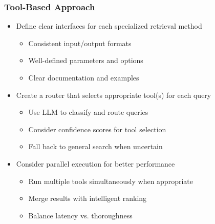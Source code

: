 {    \begin{frame}
        \frametitle{Tool-Based Approach}
        \begin{itemize}
            \item Define clear interfaces for each specialized retrieval method
            \begin{itemize}
                \item Consistent input/output formats
                \item Well-defined parameters and options
                \item Clear documentation and examples
            \end{itemize}
            \item Create a router that selects appropriate tool(s) for each query
            \begin{itemize}
                \item Use LLM to classify and route queries
                \item Consider confidence scores for tool selection
                \item Fall back to general search when uncertain
            \end{itemize}
            \item Consider parallel execution for better performance
            \begin{itemize}
                \item Run multiple tools simultaneously when appropriate
                \item Merge results with intelligent ranking
                \item Balance latency vs. thoroughness
            \end{itemize}
        \end{itemize}
    \end{frame}

}
